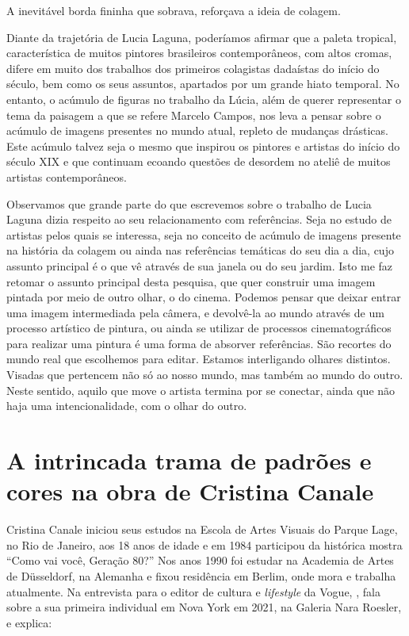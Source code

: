 A inevitável borda fininha que sobrava, reforçava a ideia de colagem.

Diante da trajetória de Lucia Laguna, poderíamos afirmar que a paleta
tropical, característica de muitos pintores brasileiros contemporâneos,
com altos cromas, difere em muito dos trabalhos dos primeiros
colagistas dadaístas do início do século, bem como os seus assuntos,
apartados por um grande hiato temporal. No entanto, o acúmulo de
figuras no trabalho da Lúcia, além de querer representar o tema da
paisagem a que se refere Marcelo Campos, nos leva a pensar sobre o
acúmulo de imagens presentes no mundo atual, repleto de mudanças
drásticas. Este acúmulo talvez seja o mesmo que inspirou os pintores e
artistas do início do século XIX e que continuam ecoando questões de
desordem no ateliê de muitos artistas contemporâneos.

Observamos que grande parte do que escrevemos sobre o trabalho de Lucia
Laguna dizia respeito ao seu relacionamento com referências. Seja no
estudo de artistas pelos quais se interessa, seja no conceito de
acúmulo de imagens presente na história da colagem ou ainda nas
referências temáticas do seu dia a dia, cujo assunto principal é o que
vê através de sua janela ou do seu jardim. Isto me faz retomar o
assunto principal desta pesquisa, que quer construir uma imagem pintada
por meio de outro olhar, o do cinema. Podemos pensar que deixar entrar
uma imagem intermediada pela câmera, e devolvê-la ao mundo através de
um processo artístico de pintura, ou ainda se utilizar de processos
cinematográficos para realizar uma pintura é uma forma de absorver
referências. São recortes do mundo real que escolhemos para editar.
Estamos interligando olhares distintos. Visadas que pertencem não só ao
nosso mundo, mas também ao mundo do outro. Neste sentido, aquilo que
move o artista termina por se conectar, ainda que não haja uma
intencionalidade, com o olhar do outro.

\section{A intrincada trama de padrões e cores na obra de Cristina Canale}%
\label{a-intrincada-trama-de-padruxf5es-e-cores-na-obra-de-cristina-canale}

Cristina Canale iniciou seus estudos na Escola de Artes Visuais do
Parque Lage, no Rio de Janeiro, aos 18 anos de idade e em 1984
participou da histórica mostra \enquote{Como vai você, Geração 80?} Nos
anos 1990 foi estudar na Academia de Artes de Düsseldorf, na Alemanha e
fixou residência em Berlim, onde mora e trabalha atualmente. Na
entrevista para o editor de cultura e \emph{lifestyle} da Vogue,
\citeauthor{mello2021canale}, fala sobre a sua primeira individual em Nova York em 2021, na
Galeria Nara Roesler, e explica:

